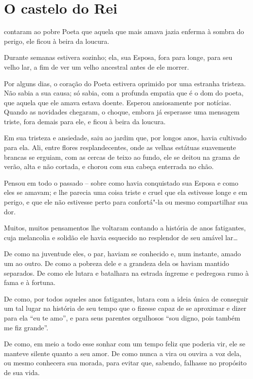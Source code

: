 \chapter{O castelo do Rei}

 contaram ao pobre Poeta que aquela que mais amava jazia
enferma à sombra do perigo, ele ficou à beira da loucura.

\qquad Durante semanas estivera sozinho; ela, sua Esposa, fora para longe, para
seu velho lar, a fim de ver um velho ancestral antes de ele morrer.

Por alguns dias, o coração do Poeta estivera oprimido por uma estranha
tristeza. Não sabia a sua causa; só sabia, com a profunda empatia
que é o dom do poeta, que aquela que ele amava estava doente. Esperou
ansiosamente por notícias. Quando as novidades chegaram, o choque,
embora já esperasse uma mensagem triste, fora demais para ele, e
ficou à beira da loucura.

Em sua tristeza e ansiedade, saiu ao jardim que, por longos anos, havia
cultivado para ela. Ali, entre flores resplandecentes, onde as velhas
estátuas suavemente brancas se erguiam, com as cercas de teixo ao fundo,
ele se deitou na grama de verão, alta e não cortada, e chorou com sua
cabeça enterrada no chão.

Pensou em todo o passado -- sobre como havia conquistado sua Esposa
e como eles se amavam; e lhe parecia uma coisa triste e cruel que ela
estivesse longe e em perigo, e que ele não estivesse perto para
confortá"-la ou mesmo compartilhar sua dor.

Muitos, muitos pensamentos lhe voltaram contando a história de anos
fatigantes, cuja melancolia e solidão ele havia esquecido no resplendor
de seu amável lar\ldots{}

De como na juventude eles, o par, haviam se conhecido e, num instante,
amado um ao outro. De como a pobreza dele e a grandeza dela os haviam
mantido separados. De como ele lutara e batalhara na estrada íngreme e
pedregosa rumo à fama e à fortuna.

De como, por todos aqueles anos fatigantes, lutara com a 
ideia única de conseguir um tal lugar na história de seu tempo que o fizesse
capaz de se aproximar e dizer para ela ``eu te amo'', e para seus
parentes orgulhosos ``sou digno, pois também me fiz grande''.

De como, em meio a todo esse sonhar com um tempo feliz que poderia vir,
ele se manteve silente quanto a seu amor. De como nunca a vira ou ouvira
a voz dela, ou mesmo conhecera sua morada, para evitar que, sabendo,
falhasse no propósito de sua vida.


